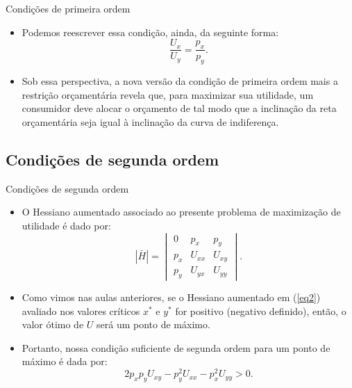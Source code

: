 \documentclass[10pt]{beamer}
\begin{document}
\begin{frame}{Condições de primeira ordem}
\begin{itemize}
    \item Podemos reescrever essa condição, ainda, da seguinte forma:
    \[
    \frac{U_x}{U_y} = \frac{p_x}{p_y}.
    \]
    \bigskip
    \item Sob essa perspectiva, a nova versão da condição de primeira ordem mais a restrição orçamentária revela que, para maximizar sua utilidade, um consumidor deve alocar o orçamento de tal modo que a inclinação da reta orçamentária seja igual à inclinação da curva de indiferença.
\end{itemize}
\end{frame}

\subsection{Condições de segunda ordem}
\begin{frame}{Condições de segunda ordem}
    \begin{itemize}
        \item O Hessiano aumentado associado ao presente problema de maximização de utilidade é dado por:
        \begin{equation}
            |\bar{H}| = \begin{vmatrix}
            0 & p_x & p_y \\
            p_x & U_{xx} & U_{xy} \\
            p_y & U_{yx} & U_{yy}
            \end{vmatrix}.
            \label{eq2}
        \end{equation}
        \bigskip
        \item Como vimos nas aulas anteriores, se o Hessiano aumentado em (\ref{eq2}) avaliado nos valores críticos $x^*$ e $y^*$ for positivo (negativo definido), então, o valor ótimo de $U$ será um ponto de máximo.
        \bigskip
        \item Portanto, nossa condição suficiente de segunda ordem para um ponto de máximo é dada por:
        \[
        2p_xp_yU_{xy} - p_y^2U_{xx} - p_x^2U_{yy} > 0.
        \]
    \end{itemize}
\end{frame}
\end{document}
